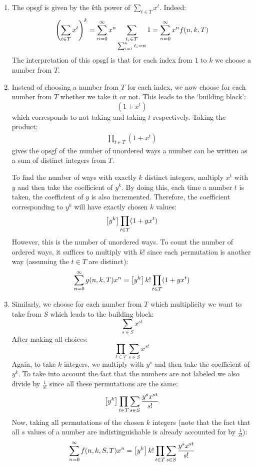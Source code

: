 \begin{solution}
    \begin{enumerate}[label=(\alph*)]
        \item The opsgf is given by the $k$th power of $\sum_{t\in T} x^t$. Indeed:
        \[
            \left(\sum_{t\in T} x^t\right)^k = \sum_{n=0}^\infty x^n  \sum_{\substack{t_i \in T \\ \sum_{i=1}^k t_i = n}} 1 = \sum_{n=0}^\infty x^n f(n,k,T)
        \]
        The interpretation of this opsgf is that for each index from $1$ to $k$ we choose a number from $T$.
        \item Instead of choosing a number from $T$ for each index, we now choose for each number from $T$ whether we take it or not. This leads to the `building block':
        \[
            (1 + x^t)
        \]
        which corresponds to not taking and taking $t$ respectively. Taking the product:
        \begin{align*}
            \prod_{t\in T} (1+x^t)
        \end{align*}
        gives the opsgf of the number of unordered ways a number can be written as a sum of distinct integers from $T$. 
        
        To find the number of ways with exactly $k$ distinct integers, multiply $x^t$ with $y$ and then take the coefficient of $y^k$. By doing this, each time a number $t$ is taken, the coefficient of $y$ is also incremented. Therefore, the coefficient corresponding to $y^k$ will have exactly chosen $k$ values:
        \begin{align*}
            \left[y^k\right] \prod_{t\in T} (1+yx^t)
        \end{align*}
        However, this is the number of unordered ways. To count the number of ordered ways, it suffices to multiply with $k!$ since each permutation is another way (assuming the $t \in T$ are distinct):
        \[
            \sum_{n=0}^\infty g(n,k,T)x^n = \left[y^k\right] k! \prod_{t\in T} (1+yx^t)
        \]
        \item Similarly, we choose for each number from $T$ which multiplicity we want to take from $S$ which leads to the building block:
        \[
            \sum_{s \in S} x^{st}
        \]
        After making all choices:
        \[
            \prod_{t\in T} \sum_{s \in S} x^{st}
        \]
        Again, to take $k$ integers, we multiply with $y^s$ and then take the coefficient of $y^k$. To take into account the fact that the numbers are not labeled we also divide by $\frac{1}{s!}$ since all these permutations are the same:
        \[
            \left[y^k\right] \prod_{t\in T} \sum_{s \in S} \frac{y^sx^{st}}{s!}
        \]
        Now, taking all permutations of the chosen $k$ integers (note that the fact that all $s$ values of a number are indistinguishable is already accounted for by $\frac{1}{s!}$):
        \[
            \sum_{n=0}^\infty f(n,k,S,T)x^n = \left[y^k\right] k!\prod_{t\in T} \sum_{s \in S} \frac{y^sx^{st}}{s!}
        \]
    \end{enumerate}
\end{solution}

